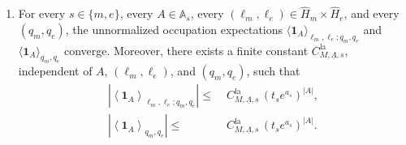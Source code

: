 \begin{theorem}
\begin{enumerate}[label=(\roman*)]
		\item \label{thmItem:occFinite}
		For every \(s\in\{m,e\}\), every \(A\in\mathbb A_s\), every
		\((\ell_m,\ell_e)\in\widehat H_m\times\widehat H_e\), and every \((q_m,q_e)\), the
		unnormalized occupation expectations
		\(\langle \mathbf 1_A\rangle_{\ell_m,\ell_e;q_m,q_e}\) and
		\(\langle \mathbf 1_A\rangle_{q_m,q_e}\) converge. Moreover, there exists a finite
		constant \(C_{M,\underline\Lambda,s}^{\mathrm{la}}\), independent of \(A\),
		\((\ell_m,\ell_e)\), and \((q_m,q_e)\), such that
		\begin{align}
			\left|
			\left\langle \mathbf 1_A \right\rangle_{\ell_m,\ell_e;q_m,q_e}
			\right|
			\le&\;
			C_{M,\underline\Lambda,s}^{\mathrm{la}}\,(t_s e^{a_s})^{|A|},
			\label{eq:sector-occupancy-bound}
		\\
			\left|
			\left\langle \mathbf 1_A \right\rangle_{q_m,q_e}
			\right|
			\le&\;
			C_{M,\underline\Lambda,s}^{\mathrm{la}}\,(t_s e^{a_s})^{|A|}.
			\label{eq:fixed-background-occupancy-bound}
		\end{align}
	\end{enumerate}
\end{theorem}

